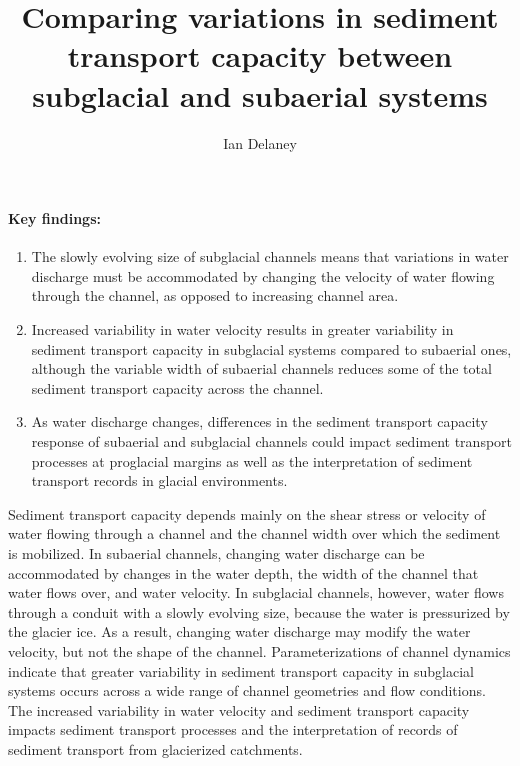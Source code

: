 \documentclass[11pt]{article}
\author[1]{Ian Delaney}
\affil[1]{Institut des dynamiques de la surface terrestre (IDYST), Universit\'{e} de Lausanne


  B\^{a}timent G\'{e}opolis, CH-1015 Lausanne}
\title{Comparing variations in sediment transport capacity between subglacial and subaerial systems }
\begin{document}
\maketitle

\paragraph{Key findings:}
\begin{enumerate}
\item The slowly evolving size of subglacial channels means that variations in water discharge must be accommodated by changing the velocity of water flowing through the channel, as opposed to increasing channel area.

\item Increased variability in water velocity results in greater variability in sediment transport capacity in subglacial systems compared to subaerial ones, although the variable width of subaerial channels reduces some of the total sediment transport capacity across the channel.

\item  As water discharge changes, differences in the sediment transport capacity response of subaerial and subglacial channels could impact sediment transport processes at proglacial margins as well as the interpretation of sediment transport records in glacial environments. 
\end{enumerate}

\abstract %
Sediment transport capacity depends mainly on the shear stress or velocity of water flowing through a channel and the channel width over which the sediment is mobilized.
In subaerial channels, changing water discharge can be accommodated by changes in the water depth, the width of the channel that  water flows over, and water velocity.
In subglacial channels, however, water flows through a conduit with a slowly evolving size, because the water is pressurized by the glacier ice.
As a result, changing water discharge may modify the water velocity, but not the  shape of the channel.
Parameterizations of channel dynamics indicate that greater variability in sediment transport capacity in subglacial systems occurs across a wide range of channel geometries and flow conditions.
The increased variability in water velocity and sediment transport capacity impacts sediment transport processes and the interpretation of records of sediment transport from glacierized catchments.

\vspace{0.5cm}
\end{document}
